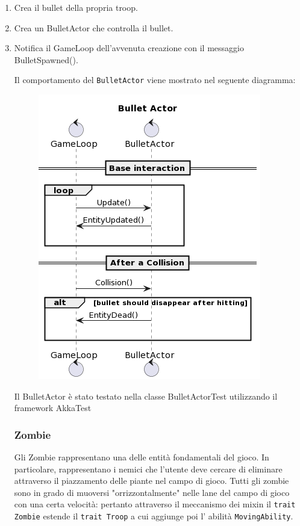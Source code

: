 \begin{enumerate}
    \item Crea il bullet della propria troop.
    \item Crea un BulletActor che controlla il bullet.
    \item Notifica il GameLoop dell'avvenuta creazione con il messaggio BulletSpawned().

Il comportamento del \texttt{BulletActor} viene mostrato nel seguente diagramma:
\begin{figure}[H]
    \centering
    \includegraphics[width=\linewidth]{images/bullet-actor.png}
    \label{Diagramma di sequenza del Troop Actor.}
\end{figure}

Il BulletActor è stato testato nella classe BulletActorTest utilizzando il framework AkkaTest

\subsubsection{Zombie}
Gli Zombie rappresentano una delle entità fondamentali del gioco. In particolare, rappresentano i nemici che l'utente
deve cercare di eliminare attraverso il piazzamento delle piante nel campo di gioco.
Tutti gli zombie sono in grado di muoversi "orrizzontalmente" nelle lane del campo di gioco con una certa velocità: pertanto
attraverso il meccanismo dei mixin il \texttt{trait Zombie} estende il \texttt{trait Troop} a cui aggiunge poi l' abilità \texttt{MovingAbility}.


\end{enumerate}
